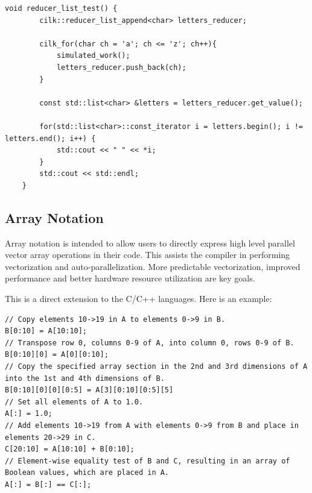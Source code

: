 \documentclass[a4paper,10pt,openright,openbib,twocolumn]{article}
\begin{document}
\begin{minipage}{.45\textwidth}    
        \begin{lstlisting}[caption=Example showing the usage of Cilk Plus Reducers]
    void reducer_list_test() {
        cilk::reducer_list_append<char> letters_reducer;

        cilk_for(char ch = 'a'; ch <= 'z'; ch++){
            simulated_work();
            letters_reducer.push_back(ch);
        }

        const std::list<char> &letters = letters_reducer.get_value();

        for(std::list<char>::const_iterator i = letters.begin(); i != letters.end(); i++) {
            std::cout << " " << *i;
        }
        std::cout << std::endl;
    }
        \end{lstlisting}
\end{minipage}

\subsection{Array Notation}

Array notation is intended to allow users to directly express high level parallel vector array operations in their code. This assists the compiler in performing vectorization and auto-parallelization. More predictable vectorization, improved performance and better hardware resource utilization are key goals. 

This is a direct extension to the C/C++ languages. Here is an example:

\begin{minipage}{.45\textwidth}    
        \begin{lstlisting}[caption=Examples of Cilk Plus Array Notation]
// Copy elements 10->19 in A to elements 0->9 in B.
B[0:10] = A[10:10];
// Transpose row 0, columns 0-9 of A, into column 0, rows 0-9 of B.
B[0:10][0] = A[0][0:10];
// Copy the specified array section in the 2nd and 3rd dimensions of A into the 1st and 4th dimensions of B.
B[0:10][0][0][0:5] = A[3][0:10][0:5][5]
// Set all elements of A to 1.0.
A[:] = 1.0;
// Add elements 10->19 from A with elements 0->9 from B and place in elements 20->29 in C.
C[20:10] = A[10:10] + B[0:10];
// Element-wise equality test of B and C, resulting in an array of Boolean values, which are placed in A.
A[:] = B[:] == C[:];
        \end{lstlisting}
\end{minipage}
\end{document}
